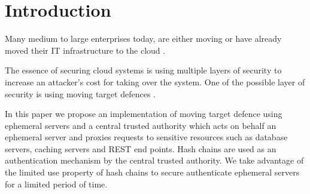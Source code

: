 \documentclass{sig-alternate-05-2015}
\begin{document}
\printccsdesc


\section*{Introduction}

Many medium to large enterprises today, are either moving or have already moved their IT infrastructure to the cloud \cite{mcafee_what_2011}.

The essence of securing cloud systems is using multiple layers \cite{panwar_layered_2011} of security to increase an attacker's cost for taking over the system. One of the possible layer of security is using moving target defences \cite{evans_effectiveness_2011}. 

In this paper we propose an implementation of moving target defence using ephemeral servers and a central trusted authority which acts on behalf an ephemeral server and proxies requests to sensitive resources such as database servers, caching servers and REST end points. Hash chains are used as an authentication mechanism by the central trusted authority. We take advantage of the limited use property of hash chains to secure authenticate ephemeral servers for a limited period of time.
\end{document}
